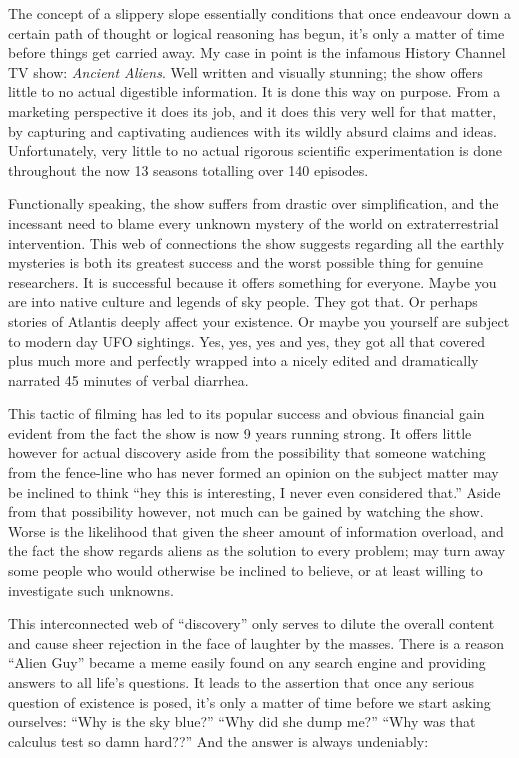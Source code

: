 The concept of a slippery slope essentially conditions that once endeavour down a
certain path of thought or logical reasoning has begun, it's only a matter of time
before things get carried away. My case in point is the infamous History Channel
TV show: \emph{Ancient Aliens}. Well written and visually stunning; the show
offers little to no actual digestible information. It is done this way on purpose.
From a marketing perspective it does its job, and it does this very well for that
matter, by capturing and captivating audiences with its wildly absurd claims and
ideas. Unfortunately, very little to no actual rigorous scientific experimentation
is done throughout the now 13 seasons totalling over 140 episodes.

Functionally speaking, the show suffers from drastic over simplification, and the
incessant need to blame every unknown mystery of the world on extraterrestrial
intervention. This web of connections the show suggests regarding all the earthly
mysteries is both its greatest success and the worst possible thing for genuine
researchers. It is successful because it offers something for everyone. Maybe you
are into native culture and legends of sky people. They got that. Or perhaps
stories of Atlantis deeply affect your existence. Or maybe you yourself are
subject to modern day UFO sightings. Yes, yes, yes and yes, they got all that
covered plus much more and perfectly wrapped into a nicely edited and dramatically
narrated 45 minutes of verbal diarrhea.

This tactic of filming has led to its popular success and obvious financial gain
evident from the fact the show is now 9 years running strong. It offers little
however for actual discovery aside from the possibility that someone watching from
the fence-line who has never formed an opinion on the subject matter may be
inclined to think ``hey this is interesting, I never even considered that.'' Aside
from that possibility however, not much can be gained by watching the show. Worse
is the likelihood that given the sheer amount of information overload, and the fact
the show regards aliens as the solution to every problem; may turn away some people
who would otherwise be inclined to believe, or at least willing to investigate such
unknowns.

This interconnected web of ``discovery'' only serves to dilute the overall content
and cause sheer rejection in the face of laughter by the masses. There is a reason
``Alien Guy'' became a meme easily found on any search engine and providing answers
to all life's questions. It leads to the assertion that once any serious question of
existence is posed, it's only a matter of time before we start asking ourselves:
``Why is the sky blue?'' ``Why did she dump me?'' ``Why was that calculus test so
damn hard??'' And the answer is always undeniably:

